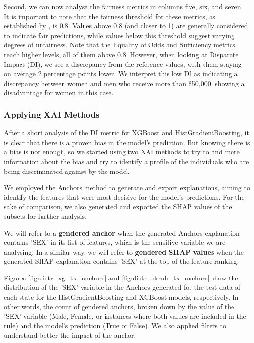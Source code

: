 Second, we can now analyse the fairness metrics in columns five, six, and seven.
It is important to note that the fairness threshold for these metrics, as established by \cite{di-besse}, is 0.8. Values above 0.8 (and closer to 1) are generally considered to indicate fair predictions, while values below this threshold suggest varying degrees of unfairness.
Note that the Equality of Odds and Sufficiency metrics reach higher levels, all of them above 0.8. However, when looking at Disparate Impact (DI), we see a discrepancy from the reference values, with them staying on average 2 percentage points lower.
We interpret this low DI as indicating a discrepancy between women and men who receive more than \$50,000, showing a disadvantage for women in this case.

\subsubsection{Applying XAI Methods}
\label{met:fairness-xai}

After a short analysis of the DI metric for XGBoost and HistGradientBoosting, it is clear that there is a proven bias in the model's prediction. But knowing there is a bias is not enough, so we started using two XAI methods to try to find more information about the bias and try to identify a profile of the individuals who are being discriminated against by the model.

We employed the Anchors method \cite{anchors-ribeiro} to generate and export explanations, aiming to identify the features that were most decisive for the model's predictions.
For the sake of comparison, we also generated and exported the SHAP values of the subsets for further analysis.

We will refer to a \textbf{gendered anchor} when the generated Anchors explanation contains 'SEX' in its list of features, which is the sensitive variable we are analysing. In a similar way, we will refer to \textbf{gendered SHAP values} when the generated SHAP explanation contains 'SEX' at the top of the feature ranking.



Figures \ref{fig:distr_xg_tx_anchors} and \ref{fig:distr_skrub_tx_anchors} show the distribution of the 'SEX' variable in the Anchors generated for the test data of each state for the HistGradientBoosting and XGBoost models, respectively. In other words, the count of gendered anchors, broken down by the value of the 'SEX' variable (Male, Female, or instances where both values are included in the rule) and the model's prediction (True or False).
We also applied filters to understand better the impact of the anchor.

